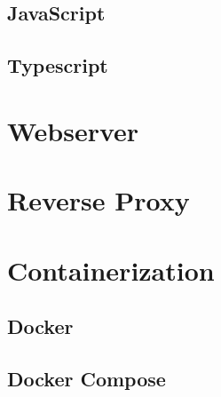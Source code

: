 \subsection{JavaScript}
\subsection{Typescript}

\section{Webserver}

\section{Reverse Proxy}

\section{Containerization}
\subsection{Docker}
\subsection{Docker Compose}
